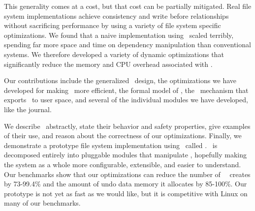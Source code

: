 \begin{comment}
The \Kudos\ storage system implementation is decomposed entirely into
 pluggable \modules\ that manipulate \patches, hopefully making the system
 as a whole more configurable, extensible, and easier to understand.
%
Any storage system \module\ can generate \patches; other modules can examine
 them and modify them when required.
%
\Patch\ dependencies are obeyed by all other storage system layers, allowing
 them to be passed through layers such as loopback block devices.
%
As a result, the loosely-coupled \modules\ that implement a file system
 can cooperate to enforce strong and often complex consistency guarantees,
 even though each \module\ only does a small part of the work.
\end{comment}


This generality comes at a cost, but that cost can be partially mitigated.
%
Real file system implementations achieve consistency and write before
 relationships without sacrificing performance by using a variety of file
 system specific optimizations.
%
We found that a naive implementation using \patches\ scaled terribly,
 spending far more space and time on dependency manipulation than
 conventional systems.
%
We therefore developed a variety of dynamic optimizations that
 significantly reduce the memory and CPU overhead associated with \patches.


Our contributions include the generalized \patch\ design, the
 optimizations we have developed for making \patches\ more efficient,
 the formal model of \patches, the \patchgroup\ mechanism that exports
 \patches\ to user space, and several of the individual modules we
 have developed, like the journal.


We describe \patches\ abstractly, state their behavior and safety
 properties, give examples of their use, and reason about the
 correctness of our optimizations.
%
Finally, we demonstrate a prototype file system implementation using
 \patches\ called \Kudos.
%
\Kudos\ is decomposed entirely into pluggable modules that manipulate
 \patches, hopefully making the system as a whole more configurable,
 extensible, and easier to understand.
%
Our benchmarks show that our optimizations can reduce the number of
 \patches\ \Kudos\ creates by 73-99.4\% and the amount of undo data
 memory it allocates by 85-100\%.
%
Our prototype is not yet as fast as we would like, but it is competitive
 with Linux on many of our benchmarks.
